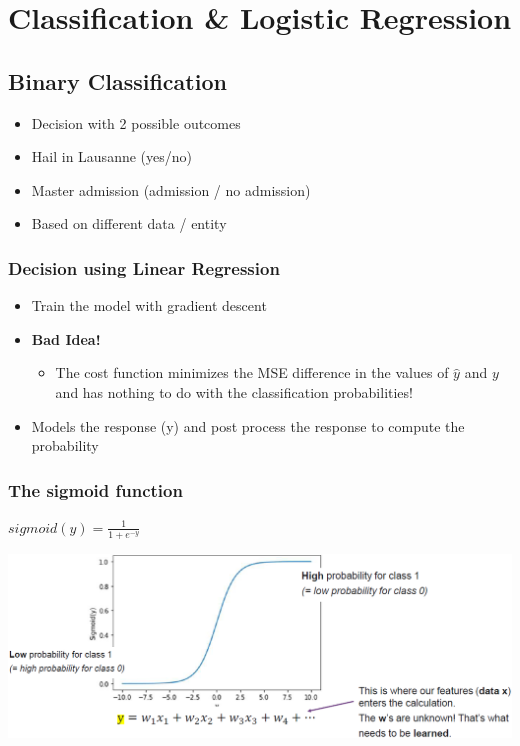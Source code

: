 \section{Classification \& Logistic Regression}
\subsection{Binary Classification}
\begin{itemize}
    \item Decision with 2 possible outcomes
    \item Hail in Lausanne (yes/no)
    \item Master admission (admission / no admission)
    \item Based on different data / entity
\end{itemize}

\subsubsection{Decision using Linear Regression}
\begin{itemize}
    \item Train the model with gradient descent
    \item \textbf{Bad Idea!}
    \begin{itemize}
        \item The cost function minimizes the MSE difference in the values of $\hat{y}$ and $y$ and has nothing to do with the classification probabilities!
    \end{itemize}
    \item Models the response (y) and post process the response to compute the probability
\end{itemize}

\subsubsection{The sigmoid function}
\begin{center}
    $sigmoid(y) = \frac{1}{1 + e^{-y}}$
\end{center}
\includegraphics[width=\linewidth]{./img/sigmoid.png}

